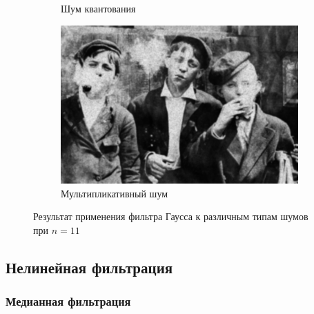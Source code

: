 \begin{figure}[ht]
\begin{subfigure}[b]{0.5\linewidth}
      \caption{Шум квантования} 
      \label{gaussian_11:e}
    \end{subfigure}%
    \begin{subfigure}[b]{0.5\linewidth}
        \centering
        \includegraphics[width=0.95\linewidth]{../Gaussian_Blur/Gaussian_Blur_Speckle_noise_(11,11).jpg} 
        \caption{Мультипликативный шум} 
        \label{gaussian_11:f} 
    \end{subfigure} 
    \caption{Результат применения фильтра Гаусса к различным типам шумов при $n = 11$}
    \label{img:gaussian_11} 
\end{figure}
  \FloatBarrier

\subsection{Нелинейная фильтрация}

\subsubsection{Медианная фильтрация}

